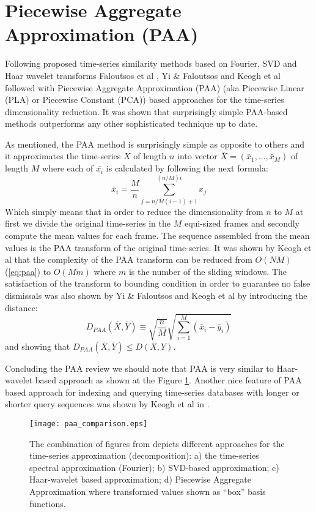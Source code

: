 \section{Piecewise Aggregate Approximation (PAA)}
Following proposed time-series similarity methods based on Fourier, SVD and Haar wavelet transforms Faloutsos et al \cite{citeulike:4344279}, Yi \& Faloutsos \cite{citeulike:2946589} and Keogh et al \cite{citeulike:3000416} followed with Piecewise Aggregate Approximation (PAA) (aka Piecewise Linear (PLA) or Piecewise Constant (PCA)) based approaches for the time-series dimensionality reduction. It was shown that surprisingly simple PAA-based methods outperforms any other sophisticated technique up to date.

As mentioned, the PAA method is surprisingly simple as opposite to others and it approximates the time-series $X$ of length $n$ into vector $\bar{X} = ( \bar{x}_{1}, ..., \bar{x}_{M} )$ of length $M$ where each of $\bar{x_{i}}$ is calculated by following the next formula:
\begin{equation}
\bar{x}_{i} = \frac{M}{n} \sum_{j=n/M(i-1)+1}^{(n/M)i} x_{j}
\label{eq:paa}
\end{equation}
Which simply means that in order to reduce the dimensionality from $n$ to $M$ at first we divide the original time-series in the $M$ equi-sized frames and secondly compute the mean values for each frame. The sequence assembled from the mean values is the PAA transform of the original time-series. It was shown by Keogh et al that the complexity of the PAA transform can be reduced from $O(NM)$ (\ref{eq:paa}) to $O(Mm)$ where $m$ is the number of the sliding windows. The satisfaction of the transform to bounding condition in order to guarantee no false dismissals was
also shown by Yi \& Faloutsos and Keogh et al by introducing the distance:
\begin{equation}
D_{PAA}(\bar{X}, \bar{Y}) \equiv \sqrt{\frac{n}{M}} \sqrt{ \sum_{i=1}^{M} 
\left(  \bar{x}_{i} - \bar{y}_{i} \right)}
\label{eq:paa_distnace}
\end{equation}
and showing that $D_{PAA}(\bar{X}, \bar{Y}) \leq D(X,Y)$.

Concluding the PAA review we should note that PAA is very similar to Haar-wavelet based approach \cite{citeulike:4384535} as shown at the Figure \ref{fig:paa_comparison}. Another nice feature of PAA based approach for indexing and querying time-series databases with longer or shorter query sequences was shown by Keogh et al in \cite{citeulike:3000416}.
\begin{figure}[tbp]
   \centering
   \texttt{[image: paa\_comparison.eps]}
   \caption{The combination of figures from \cite{citeulike:3000416} depicts different approaches for the time-series approximation (decomposition): a) the time-series spectral approximation (Fourier); b) SVD-based approximation; c) Haar-wavelet based approximation; d) Piecewise Aggregate Approximation where transformed values shown as ``box'' basis functions.}
   \label{fig:paa_comparison}
\end{figure} 

